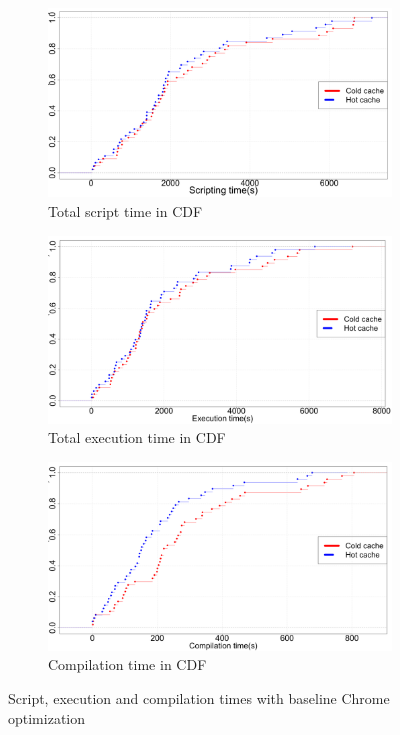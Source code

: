\begin{figure}[!bth]
\begin{subfigure}[b]{0.33\textwidth}
\centering
  \includegraphics[width=\linewidth]{figs/chrome_script.png}
\caption{Total script time in CDF}
\label{fig:script_p2}
\end{subfigure}
\begin{subfigure}[b]{0.33\textwidth}
\centering
\includegraphics[width=\linewidth]{figs/chrome_exec.png}
\caption{Total execution time in CDF}
\label{fig:exec_p2}
\end{subfigure}
\begin{subfigure}[b]{0.33\textwidth}
\centering
\includegraphics[width=\linewidth]{figs/chrome_compile.png}
\caption{Compilation time in CDF}
\label{fig:compile_p2}
\end{subfigure}
\caption{Script, execution and compilation times with baseline Chrome
  optimization}
\end{figure}

